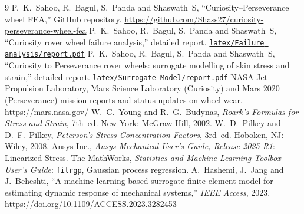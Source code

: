 \documentclass[conference,a4paper]{IEEEtran}
\newcommand{\repo}{https://github.com/Shass27/curiosity-perseverance-wheel-fea}
\newcommand{\blob}{\repo/blob/main}
\begin{document}
\clearpage
\onecolumn   %
\begin{thebibliography}{9}\scriptsize   %
   P.~K.~Sahoo, R.~Bagul, S.~Panda and Shaswath~S, ``Curiosity--Perseverance wheel FEA,'' GitHub repository. \url{\repo}
   P.~K.~Sahoo, R.~Bagul, S.~Panda and Shaswath~S, ``Curiosity rover wheel failure analysis,'' detailed report. \href{\blob/latex/Failure\%20analysis/report.pdf}{\texttt{latex/Failure analysis/report.pdf}}
   P.~K.~Sahoo, R.~Bagul, S.~Panda and Shaswath~S, ``Curiosity to Perseverance rover wheels: surrogate modelling of skin stress and strain,'' detailed report. \href{\blob/latex/Surrogate\%20Model/report.pdf}{\texttt{latex/Surrogate Model/report.pdf}}
   NASA Jet Propulsion Laboratory, Mars Science Laboratory (Curiosity) and Mars 2020 (Perseverance) mission reports and status updates on wheel wear. \url{https://mars.nasa.gov/}
   W.~C.~Young and R.~G.~Budynas, \emph{Roark's Formulas for Stress and Strain}, 7th~ed. New York: McGraw-Hill, 2002.
   W.~D.~Pilkey and D.~F.~Pilkey, \emph{Peterson's Stress Concentration Factors}, 3rd~ed. Hoboken, NJ: Wiley, 2008.
   Ansys Inc., \emph{Ansys Mechanical User's Guide, Release 2025 R1}: Linearized Stress.
   The MathWorks, \emph{Statistics and Machine Learning Toolbox User's Guide}: \texttt{fitrgp}, Gaussian process regression.
   A.~Hashemi, J.~Jang and J.~Beheshti, ``A machine learning-based surrogate finite element model for estimating dynamic response of mechanical systems,'' \emph{IEEE Access}, 2023. \url{https://doi.org/10.1109/ACCESS.2023.3282453}
\end{thebibliography}
\end{document}

